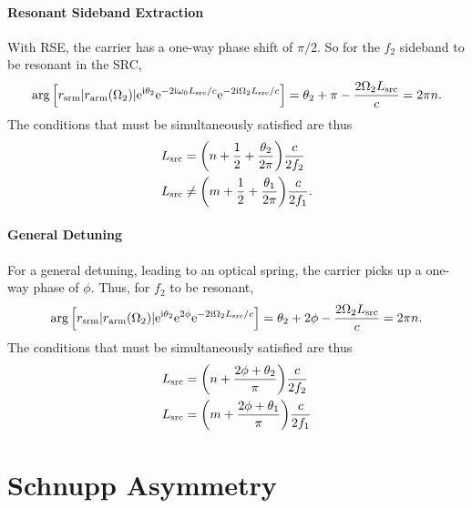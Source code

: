 \documentclass[12pt]{article}
\newcommand{\mr}[1]{\mathrm{#1}}
\newcommand{\e}{\mr{e}}
\renewcommand{\i}{\mr{i}}
\newcommand{\abs}[1]{\left|#1\right|}
\let\originalleft\left
\let\originalright\right
\renewcommand{\left}{\mathopen{}\mathclose\bgroup\originalleft}
\renewcommand{\right}{\aftergroup\egroup\originalright}
\begin{document}
\paragraph{Resonant Sideband Extraction} With RSE, the carrier has a one-way phase shift of $\pi/2$. So for the $f_2$ sideband to be resonant in the SRC,
\begin{equation}
\arg \Big[r_\mr{srm} \abs{r_\mr{arm}(\Omega_2)}\e^{\i\theta_2} \e^{-2\i\omega_0 L_\mr{src}/c}
\e^{-2\i\Omega_2 L_\mr{src}/c} \Big]
= \theta_2 + \pi - \frac{2\Omega_2 L_\mr{src}}{c}
= 2\pi n.
\end{equation}
The conditions that must be simultaneously satisfied are thus
\begin{subequations}
\begin{align}
L_\mr{src} &= \left( n + \frac{1}{2} + \frac{\theta_2}{2\pi}\right) \frac{c}{2f_2}\\
L_\mr{src} &\neq \left( m + \frac{1}{2}  + \frac{\theta_1}{2\pi}\right) \frac{c}{2f_1}.
\end{align}
\end{subequations}

\paragraph{General Detuning} For a general detuning, leading to an optical spring, the carrier picks up a one-way phase of $\phi$. Thus, for $f_2$ to be resonant,
\begin{equation}
\arg \Big[r_\mr{srm} \abs{r_\mr{arm}(\Omega_2)}\e^{\i\theta_2} \e^{2\phi}
\e^{-2\i\Omega_2 L_\mr{src}/c} \Big]
= \theta_2 + 2\phi - \frac{2\Omega_2 L_\mr{src}}{c}
= 2\pi n.
\end{equation}
The conditions that must be simultaneously satisfied are thus
\begin{subequations}
\begin{align}
L_\mr{src} &= \left( n  + \frac{2\phi + \theta_2}{\pi} \right) \frac{c}{2f_2}\\
L_\mr{src} &= \left( m  + \frac{2\phi + \theta_1}{\pi} \right) \frac{c}{2f_1}\\
\end{align}
\end{subequations}

\section{Schnupp Asymmetry}
\end{document}

